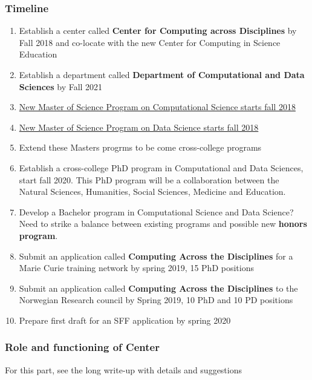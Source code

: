 \documentclass{beamer}
\begin{document}
\begin{frame}
\frametitle{Timeline}

\begin{enumerate}
\item Establish a center called \textbf{Center for Computing across Disciplines} by Fall 2018 and co-locate with the new Center for Computing in Science Education

\item Establish a department  called \textbf{Department of Computational and Data Sciences} by Fall 2021

\item \href{{http://www.uio.no/english/studies/programmes/computational-science-master/index.html}}{New Master of Science Program on Computational Science starts fall 2018}

\item \href{{http://www.uio.no/english/studies/programmes/datascience-master/index.html}}{New Master of Science Program on Data Science starts fall 2018}

\item Extend these Masters progrms to be come cross-college programs

\item Establish  a cross-college PhD program in Computational and Data Sciences, start fall 2020. This PhD program will be a collaboration between the Natural Sciences, Humanities, Social Sciences, Medicine and Education. 

\item Develop a Bachelor program in Computational Science and Data Science? Need to strike a balance between existing programs and possible new \textbf{honors program}. 

\item Submit an application called \textbf{Computing Across the Disciplines} for a Marie Curie training network by spring 2019, 15 PhD positions

\item Submit an application called \textbf{Computing Across the Disciplines} to the Norwegian Research council by Spring 2019, 10 PhD and 10 PD positions

\item Prepare first draft for an SFF application by  spring 2020
\end{enumerate}

\noindent
\end{frame}

\begin{frame}
\frametitle{Role and functioning of Center}

For this part, see the long write-up with details and suggestions
\end{frame}
\end{document}
